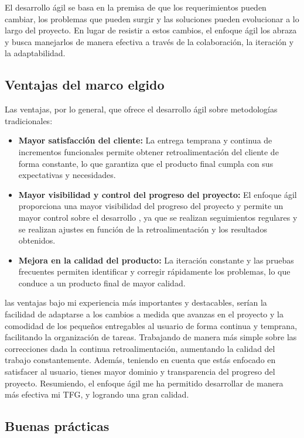 El desarrollo ágil se basa en la premisa de que los requerimientos pueden cambiar, los problemas que 
pueden surgir y las soluciones pueden evolucionar a lo largo del proyecto. En lugar de resistir a estos 
cambios, el enfoque ágil los abraza y busca manejarlos de manera efectiva a través de la colaboración, 
la iteración y la adaptabilidad.

\subsection{Ventajas del marco elgido}

Las ventajas, por lo general, que ofrece el desarrollo ágil sobre metodologías tradicionales:

\begin{itemize}
\item \textbf{Mayor satisfacción del cliente:} La entrega temprana y continua de incrementos 
funcionales permite obtener retroalimentación del cliente de forma constante, lo que garantiza que el 
producto final cumpla con sus expectativas y necesidades.
\item \textbf{Mayor visibilidad y control del progreso del proyecto:} El enfoque ágil proporciona una 
mayor visibilidad del progreso del proyecto y permite un mayor control sobre el desarrollo 
\cite{VCagileT}, ya que se realizan seguimientos regulares y se realizan ajustes en función de la 
retroalimentación y los resultados obtenidos.
\item \textbf{Mejora en la calidad del producto:} La iteración constante y las pruebas frecuentes 
permiten identificar y corregir rápidamente los problemas, lo que conduce a un producto final de mayor 
calidad.
\end{itemize}

las ventajas bajo mi experiencia más importantes y destacables, serían la facilidad de adaptarse a los 
cambios a medida que avanzas en el proyecto y la comodidad de los pequeños entregables al usuario de 
forma continua y temprana, facilitando la organización de tareas. Trabajando de manera más simple sobre 
las correcciones dada la continua retroalimentación, aumentando la calidad del trabajo constantemente. 
Además, teniendo en cuenta que estás enfocado en satisfacer al usuario, tienes mayor dominio y 
transparencia del progreso del proyecto. Resumiendo, el enfoque ágil me ha permitido desarrollar de 
manera más efectiva mi TFG, y logrando una gran calidad.

\subsection{Buenas prácticas}

